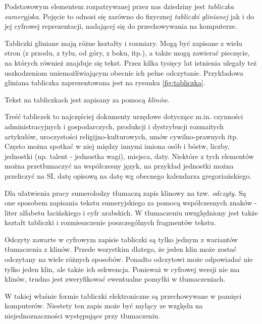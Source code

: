 Podstawowym elementem rozpatrywanej przez nas dziedziny jest \emph{tabliczka sumeryjska}. Pojęcie to odnosi się zarówno do fizycznej \emph{tabliczki glinianej} jak i do jej cyfrowej reprezentacji, nadającej się do przechowywania na komputerze. 

Tabliczki gliniane mają różne kształty i rozmiary. 
Mogą być zapisane z wielu stron (z przodu, z tyłu, od góry, z boku, itp.), a także mogą zawierać pieczęcie, na których również znajduje się tekst. Przez kilka tysięcy lat istnienia ulegały też uszkodzeniom uniemożliwiającym obecnie ich pełne odczytanie.
Przykładowa gliniana tabliczka zaprezentowana jest na rysunku \ref{fig:tabliczka}.

Tekst na tabliczkach jest zapisany za pomocą \emph{klinów}. %

Treść tabliczek to najczęściej dokumenty urzędowe dotyczące m.in. czynności administracyjnych i gospodarczych, produkcji i dystrybucji rozmaitych artykułów, uroczystości religijno-kulturowych, umów cywilno-prawnych itp. \cite{powalka}
Często można spotkać w niej między innymi imiona osób i bóstw, liczby, jednostki (np. talent - jednostka wagi), %
miejsca, daty. Niektóre z tych elementów można przetłumaczyć na współczesny język, na przykład jednostki można przeliczyć na SI, datę opisową na datę wg obecnego kalendarza gregoriańskiego. %

Dla ułatwienia pracy sumerolodzy tłumaczą zapis klinowy na tzw. \emph{odczyty}. Są one sposobem zapisania tekstu sumeryjskiego za pomocą współczesnych znaków - liter alfabetu łacińskiego i cyfr arabskich. W tłumaczeniu uwzględniony jest także kształt tabliczki i rozmieszczenie poszczególnych fragmentów tekstu. %

Odczyty zawarte w cyfrowym zapisie tabliczki są tylko jednym z wariantów tłumaczenia z klinów. Przede wszystkim dlatego, że jeden klin może zostać odczytany na wiele różnych sposobów. Ponadto odczytowi może odpowiadać nie tylko jeden klin, ale także ich sekwencja. Ponieważ w cyfrowej wersji nie ma klinów, trudno jest zweryfikować ewentualne pomyłki w tłumaczeniach.

 W takiej właśnie formie tabliczki elektroniczne są przechowywane w pamięci komputerów. Niestety ten zapis może być mylący ze względu na niejednoznaczności występujące przy tłumaczeniu. 

